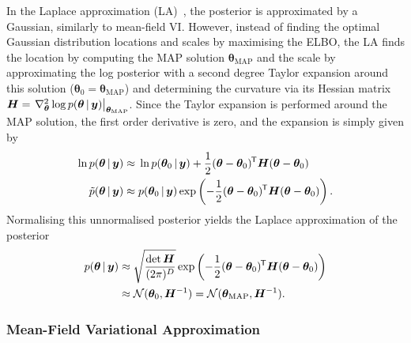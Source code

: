\documentclass[10pt,a4paper,twocolumn]{article}
\begin{document}
In the Laplace approximation (LA)~\cite{daxberger2021laplace}, the posterior is approximated by a Gaussian, similarly to mean-field VI.
However, instead of finding the optimal Gaussian distribution locations and scales by maximising the ELBO, the LA finds the location by computing the MAP solution \(\bm \theta_{\text{MAP}}\) and the scale by approximating the log posterior with a second degree Taylor expansion around this solution (\(\bm \theta_0 = \bm \theta_{\text{MAP}}\)) and determining the curvature via its Hessian matrix \(\bm H = \left.\nabla^2_{\bm \theta} \log p(\bm \theta \, | \, \bm y) \right|_{\bm \theta_\mathrm{MAP}}\).
Since the Taylor expansion is performed around the MAP solution, the first order derivative is zero, and the expansion is simply given by
\begin{align}
    \ln p(\bm \theta \, | \, \bm y) \approx{}     & \ln p(\bm \theta_0 \, | \, \bm y)        + \frac{1}{2} (\bm \theta - \bm \theta_0)^{\mkern-1.5mu\mathsf{T}} \bm H (\bm \theta - \bm \theta_0)                        \label{eq:laplace-taylor} \\
    \tilde{p}(\bm \theta \, | \, \bm y) \approx{} & p(\bm \theta_0 \, | \, \bm y) \exp\left(-\frac{1}{2} (\bm \theta - \bm \theta_0)^{\mkern-1.5mu\mathsf{T}} \bm H (\bm \theta - \bm \theta_0)\right).\nonumber
\end{align}
Normalising this unnormalised posterior yields the Laplace approximation of the posterior
\begin{align}
    p(\bm\theta \, | \, \bm y) \approx{} & \sqrt{\frac{\det\bm H}{(2 \pi)^D}} \exp\left(-\frac{1}{2} (\bm \theta - \bm \theta_0)^{\mkern-1.5mu\mathsf{T}} \bm H (\bm \theta - \bm \theta_0)\right) \nonumber \\
    \approx{}                           & \mathcal{N}(\bm \theta_0, \bm H^{-1}) = \mathcal{N}(\bm \theta_{\text{MAP}}, \bm H^{-1}).\label{eq:laplace}
\end{align}

\subsubsection{Mean-Field Variational Approximation}\label{ssec:mfvi}
\end{document}
